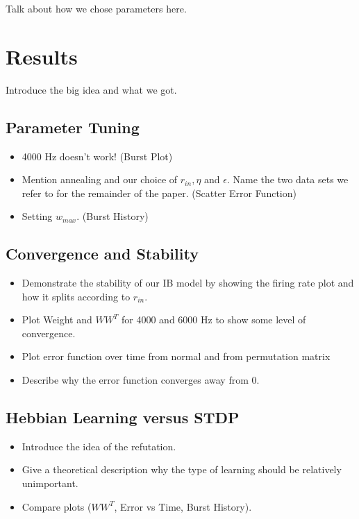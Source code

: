 \documentclass[12pt, draft]{article}
\begin{document}
Talk about how we chose parameters here.

\section{Results}

Introduce the big idea and what we got.

\subsection{Parameter Tuning}

\begin{itemize}
\item 4000 Hz doesn't work! (Burst Plot)

\item Mention annealing and our choice of \(r_{in}, \eta\) and \(\epsilon\). Name the two data sets we refer to for the remainder of the paper. (Scatter Error Function)

\item Setting \(w_{max}\). (Burst History)
\end{itemize}

\subsection{Convergence and Stability}

\begin{itemize}
\item Demonstrate the stability of our IB model by showing the firing rate plot and how it splits according to \(r_{in}\).

\item Plot Weight and \(WW^T\) for 4000 and 6000 Hz to show some level of convergence.

\item Plot error function over time from normal and from permutation matrix

\item Describe why the error function converges away from 0.
\end{itemize}

\subsection{Hebbian Learning versus STDP}

\begin{itemize}
\item Introduce the idea of the refutation. 
\item Give a theoretical description why the type of learning should be relatively unimportant.
\item Compare plots (\(WW^T\), Error vs Time, Burst History).
\end{itemize}
\end{document}
